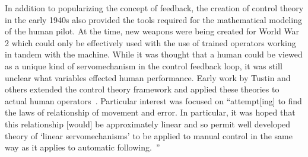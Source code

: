 \documentclass[float=false, crop=false]{standalone}
\begin{document}
In addition to popularizing the concept of feedback, the creation of control theory in the early 1940s also provided the tools required for the mathematical modeling of the human pilot.
At the time, new weapons were being created for World War 2 which could only be effectively used with the use of trained operators working in tandem with the machine.
While it was thought that a human could be viewed as a unique kind of servomechanism in the control feedback loop, it was still unclear what variables effected human performance.
Early work by Tustin and others extended the control theory framework and applied these theories to actual human operators~\cite{tustininvestigation}.
Particular interest was focused on ``attempt[ing] to find the laws of relationship of movement and error. In particular, it was hoped that this relationship [would] be approximately linear and so permit well developed theory of `linear servomechanisms' to be applied to manual control in the same way as it applies to automatic following.~\cite{tustininvestigation}''
\end{document}
